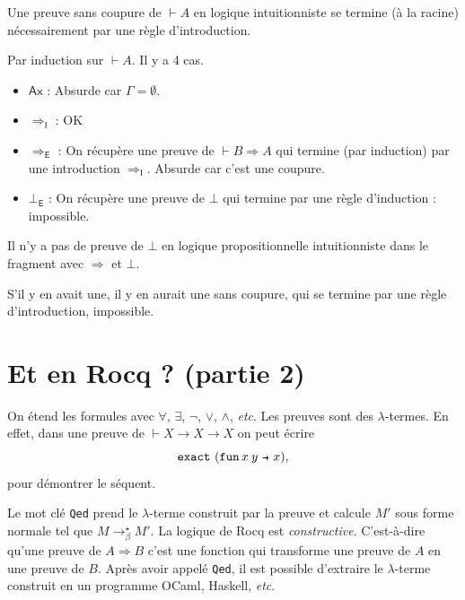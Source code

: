 \documentclass[./main]{subfiles}
\begin{document}
  \begin{lem}
    Une preuve sans coupure de $\vdash A$ en logique intuitionniste se termine (à la racine) nécessairement par une règle d'introduction.
  \end{lem}
  \begin{prv}
    Par induction sur $\vdash A$. Il y a 4 cas.
    \begin{itemize}
      \item $\mathsf{Ax}$ : Absurde car $\Gamma = \emptyset$.
      \item $\Rightarrow_\mathsf{I}$ : OK
      \item $\Rightarrow_\mathsf{E}$ : On récupère une preuve de $\vdash B \Rightarrow A$ qui termine (par induction) par une introduction $\Rightarrow_\mathsf{I}$. Absurde car c'est une coupure.
      \item $\bot_\mathsf{E}$ : On récupère une preuve de $\bot$ qui termine par une règle d'induction : impossible.
    \end{itemize}
  \end{prv}

  \begin{crlr}
    Il n'y a pas de preuve de $\bot$ en logique propositionnelle intuitionniste dans le fragment avec $\Rightarrow$ et  $\bot$.
  \end{crlr}
  \begin{prv}
    S'il y en avait une, il y en aurait une sans coupure, qui se termine par une règle d'introduction, impossible.
  \end{prv}

  \section{Et en Rocq ? (partie 2)}

  On étend les formules avec $\forall$, $\exists$, $\lnot$, $\lor$, $\land$, \textit{etc}.
  Les preuves sont des $\lambda$-termes.
  En effet, dans une preuve de $\vdash X \to X \to X$ on peut écrire \[
    \mathtt{exact}\ (\fun{x\: y}{x})
  ,\]
  pour démontrer le séquent.

  Le mot clé \texttt{Qed} prend le $\lambda$-terme construit par la preuve et calcule $M'$ sous forme normale tel que $M \to_\beta^\star M'$.
  La logique de Rocq est \textit{constructive}. C'est-à-dire qu'une preuve de $A \Rightarrow B$ c'est une fonction qui transforme une preuve de $A$ en une preuve de $B$.
  Après avoir appelé  \texttt{Qed}, il est possible d'extraire le $\lambda$-terme construit en un programme OCaml, Haskell, \textit{etc}.
\end{document}
